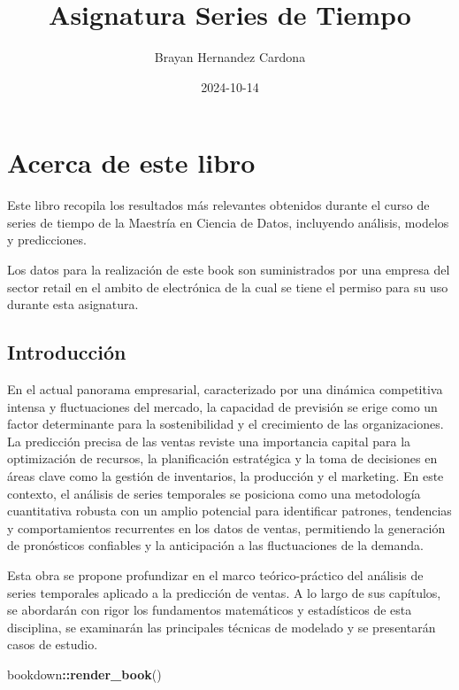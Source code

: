 \documentclass[
]{book}
\title{Asignatura Series de Tiempo}
\author{Brayan Hernandez Cardona}
\date{2024-10-14}
\newenvironment{Shaded}{\begin{snugshade}}{\end{snugshade}}
\newcommand{\FunctionTok}[1]{\textcolor[rgb]{0.13,0.29,0.53}{\textbf{#1}}}
\newcommand{\NormalTok}[1]{#1}
\newcommand{\SpecialCharTok}[1]{\textcolor[rgb]{0.81,0.36,0.00}{\textbf{#1}}}
\begin{document}
\maketitle

{
\setcounter{tocdepth}{1}
\tableofcontents
}
\chapter{Acerca de este libro}\label{acerca-de-este-libro}

Este libro recopila los resultados más relevantes obtenidos durante el curso de series de tiempo de la Maestría en Ciencia de Datos, incluyendo análisis, modelos y predicciones.

Los datos para la realización de este book son suministrados por una empresa del sector retail en el ambito de electrónica de la cual se tiene el permiso para su uso durante esta asignatura.

\section{Introducción}\label{introducciuxf3n}

En el actual panorama empresarial, caracterizado por una dinámica competitiva intensa y fluctuaciones del mercado, la capacidad de previsión se erige como un factor determinante para la sostenibilidad y el crecimiento de las organizaciones. La predicción precisa de las ventas reviste una importancia capital para la optimización de recursos, la planificación estratégica y la toma de decisiones en áreas clave como la gestión de inventarios, la producción y el marketing. En este contexto, el análisis de series temporales se posiciona como una metodología cuantitativa robusta con un amplio potencial para identificar patrones, tendencias y comportamientos recurrentes en los datos de ventas, permitiendo la generación de pronósticos confiables y la anticipación a las fluctuaciones de la demanda.

Esta obra se propone profundizar en el marco teórico-práctico del análisis de series temporales aplicado a la predicción de ventas. A lo largo de sus capítulos, se abordarán con rigor los fundamentos matemáticos y estadísticos de esta disciplina, se examinarán las principales técnicas de modelado y se presentarán casos de estudio.

\begin{Shaded}
\begin{Highlighting}[]
\NormalTok{bookdown}\SpecialCharTok{::}\FunctionTok{render\_book}\NormalTok{()}
\end{Highlighting}
\end{Shaded}
\end{document}
